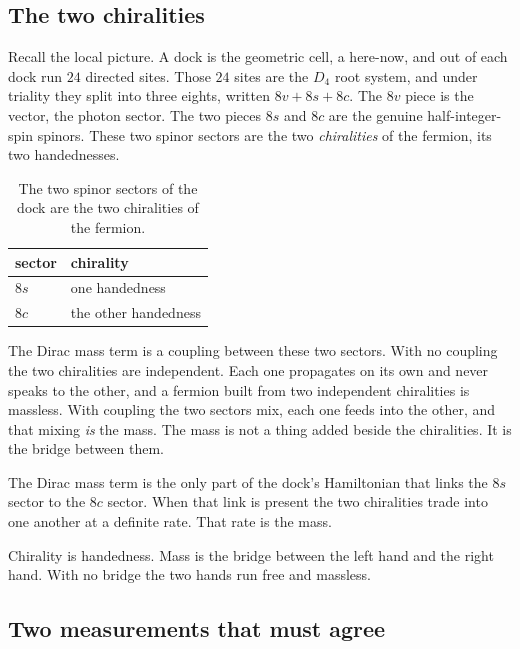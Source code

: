 \subsection{The two chiralities}

Recall the local picture. A dock is the geometric cell, a here-now, and out of each dock run $24$ directed sites. Those $24$ sites are the $D_4$ root system, and under triality they split into three eights, written $8v + 8s + 8c$. The $8v$ piece is the vector, the photon sector. The two pieces $8s$ and $8c$ are the genuine half-integer-spin spinors. These two spinor sectors are the two \emph{chiralities} of the fermion, its two handednesses.

\begin{table}[ht]
\centering
\begin{tabular}{@{}ll@{}}
\toprule
sector & chirality \\
\midrule
$8s$ & one handedness \\
$8c$ & the other handedness \\
\bottomrule
\end{tabular}
\caption{The two spinor sectors of the dock are the two chiralities of the fermion.}
\label{tab:chiralities}
\end{table}

The Dirac mass term is a coupling between these two sectors. With no coupling the two chiralities are independent. Each one propagates on its own and never speaks to the other, and a fermion built from two independent chiralities is massless. With coupling the two sectors mix, each one feeds into the other, and that mixing \emph{is} the mass. The mass is not a thing added beside the chiralities. It is the bridge between them.

\begin{definition}
The Dirac mass term is the only part of the dock's Hamiltonian that links the $8s$ sector to the $8c$ sector. When that link is present the two chiralities trade into one another at a definite rate. That rate is the mass.
\end{definition}

\begin{principle}
Chirality is handedness. Mass is the bridge between the left hand and the right hand. With no bridge the two hands run free and massless.
\end{principle}

\subsection{Two measurements that must agree}

